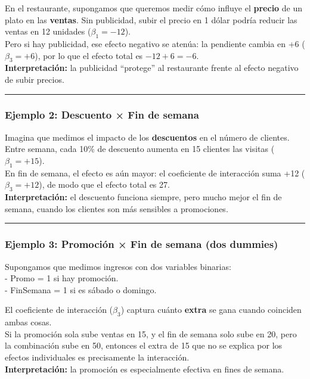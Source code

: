 \documentclass[
  spanish,
  letterpaper,
  DIV=11,
  numbers=noendperiod]{scrreprt}
\begin{document}
En el restaurante, supongamos que queremos medir cómo influye el
\textbf{precio} de un plato en las \textbf{ventas}. Sin publicidad,
subir el precio en 1 dólar podría reducir las ventas en 12 unidades
(\(\beta_1=-12\)).\\
Pero si hay publicidad, ese efecto negativo se atenúa: la pendiente
cambia en +6 (\(\beta_3=+6\)), por lo que el efecto total es
\(-12+6=-6\).\\
\textbf{Interpretación:} la publicidad ``protege'' al restaurante frente
al efecto negativo de subir precios.

\begin{center}\rule{0.5\linewidth}{0.5pt}\end{center}

\subsubsection{Ejemplo 2: Descuento × Fin de
semana}\label{ejemplo-2-descuento-fin-de-semana}

Imagina que medimos el impacto de los \textbf{descuentos} en el número
de clientes. Entre semana, cada 10\% de descuento aumenta en 15 clientes
las visitas (\(\beta_1=+15\)).\\
En fin de semana, el efecto es aún mayor: el coeficiente de interacción
suma +12 (\(\beta_3=+12\)), de modo que el efecto total es 27.\\
\textbf{Interpretación:} el descuento funciona siempre, pero mucho mejor
el fin de semana, cuando los clientes son más sensibles a promociones.

\begin{center}\rule{0.5\linewidth}{0.5pt}\end{center}

\subsubsection{Ejemplo 3: Promoción × Fin de semana (dos
dummies)}\label{ejemplo-3-promociuxf3n-fin-de-semana-dos-dummies}

Supongamos que medimos ingresos con dos variables binarias:\\
- Promo = 1 si hay promoción.\\
- FinSemana = 1 si es sábado o domingo.

El coeficiente de interacción (\(\beta_3\)) captura cuánto
\textbf{extra} se gana cuando coinciden ambas cosas.\\
Si la promoción sola sube ventas en 15, y el fin de semana solo sube en
20, pero la combinación sube en 50, entonces el extra de 15 que no se
explica por los efectos individuales es precisamente la interacción.\\
\textbf{Interpretación:} la promoción es especialmente efectiva en fines
de semana.
\end{document}
